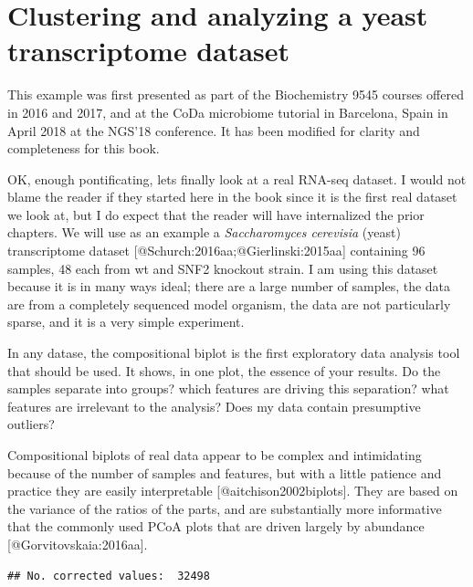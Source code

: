 \documentclass[
  onecolumn]{article}
\begin{document}
\hypertarget{clustering-and-analyzing-a-yeast-transcriptome-dataset}{%
\section{Clustering and analyzing a yeast transcriptome dataset}\label{clustering-and-analyzing-a-yeast-transcriptome-dataset}}

\hspace{2cm}\begin{minipage}[ct]{10cm}
\parskip=5pt
\parindent=5pt
This example was first presented as part of the Biochemistry 9545 courses offered in 2016 and 2017, and at the CoDa microbiome tutorial in Barcelona, Spain in April 2018 at the NGS'18 conference.  It has been modified for clarity and completeness for this book.
\end{minipage}
\vspace{1cm}

OK, enough pontificating, lets finally look at a real RNA-seq dataset. I would not blame the reader if they started here in the book since it is the first real dataset we look at, but I do expect that the reader will have internalized the prior chapters. We will use as an example a \emph{Saccharomyces cerevisia} (yeast) transcriptome dataset {[}@Schurch:2016aa;@Gierlinski:2015aa{]} containing 96 samples, 48 each from wt and SNF2 knockout strain. I am using this dataset because it is in many ways ideal; there are a large number of samples, the data are from a completely sequenced model organism, the data are not particularly sparse, and it is a very simple experiment.

In any datase, the compositional biplot is the first exploratory data analysis tool that should be used. It shows, in one plot, the essence of your results. Do the samples separate into groups? which features are driving this separation? what features are irrelevant to the analysis? Does my data contain presumptive outliers?

Compositional biplots of real data appear to be complex and intimidating because of the number of samples and features, but with a little patience and practice they are easily interpretable {[}@aitchison2002biplots{]}. They are based on the variance of the ratios of the parts, and are substantially more informative that the commonly used PCoA plots that are driven largely by abundance {[}@Gorvitovskaia:2016aa{]}.

\begin{verbatim}
## No. corrected values:  32498
\end{verbatim}
\end{document}
